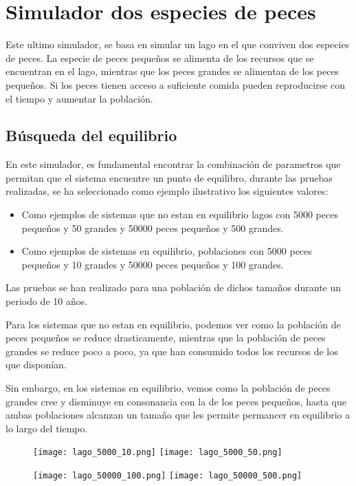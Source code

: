 \chapter{Simulador dos especies de peces}
Este ultimo simulador, se basa en simular un lago en el que conviven dos especies de peces. La especie de peces pequeños se alimenta de los recursos que se encuentran en el lago, mientras que los peces grandes se alimentan de los peces pequeños. Si los peces tienen acceso a suficiente comida pueden reproducirse con el tiempo y aumentar la población.

\section{Búsqueda del equilibrio}
En este simulador, es fundamental encontrar la combinación de parametros que permitan que el sistema encuentre un punto de equilibro, durante las pruebas realizadas, se ha seleccionado como ejemplo ilustrativo los siguientes valores:

\begin{itemize}
	\item Como ejemplos de sistemas que no estan en equilibrio lagos con 5000 peces pequeños y 50 grandes y 50000 peces pequeños y 500 grandes.
	\item Como ejemplos de sistemas en equilibrio, poblaciones con 5000 peces pequeños y 10 grandes y 50000 peces pequeños y 100 grandes.
\end{itemize}

Las pruebas se han realizado para una población de dichos tamaños durante un periodo de 10 años.

Para los sistemas que no estan en equilibrio, podemos ver como la población de peces pequeños se reduce drasticamente, mientras que la población de peces grandes se reduce poco a poco, ya que han consumido todos los recursos de los que disponían.

Sin embargo, en los sistemas en equilibrio, vemos como la población de peces grandes cree y disminuye en consonancia con la de los peces pequeños, hasta que ambas poblaciones alcanzan un tamaño que les permite permancer en equilibrio a lo largo del tiempo.

\begin{figure}[h]
\texttt{[image: lago\_5000\_10.png]}
\texttt{[image: lago\_5000\_50.png]}
\centering
\end{figure}

\begin{figure}[h]
\texttt{[image: lago\_50000\_100.png]}
\texttt{[image: lago\_50000\_500.png]}
\centering
\end{figure}

